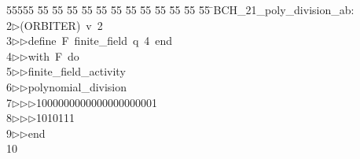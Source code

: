 %
%
\begin{tabbing}
55555 \= 55 \= 55 \= 55 \= 55 \= 55 \= 55 \= 55 \= 55 \= 55 \= 55 \= 55 \= 55 \= \>BCH\_21\_poly\_division\_ab:\\[0pt]
2\>$\triangleright$\>(ORBITER)\ v\ 2\ \\[0pt]
3\>$\triangleright$\>$\triangleright$\>define\ F\ finite\_field\ q\ 4\ end\ \\[0pt]
4\>$\triangleright$\>$\triangleright$\>with\ F\ do\ \\[0pt]
5\>$\triangleright$\>$\triangleright$\>finite\_field\_activity\ \\[0pt]
6\>$\triangleright$\>$\triangleright$\>polynomial\_division\ \\[0pt]
7\>$\triangleright$\>$\triangleright$\>$\triangleright$\>1000000000000000000001\ \\[0pt]
8\>$\triangleright$\>$\triangleright$\>$\triangleright$\>1010111\ \\[0pt]
9\>$\triangleright$\>$\triangleright$\>end\\[0pt]
10\>\end{tabbing}
